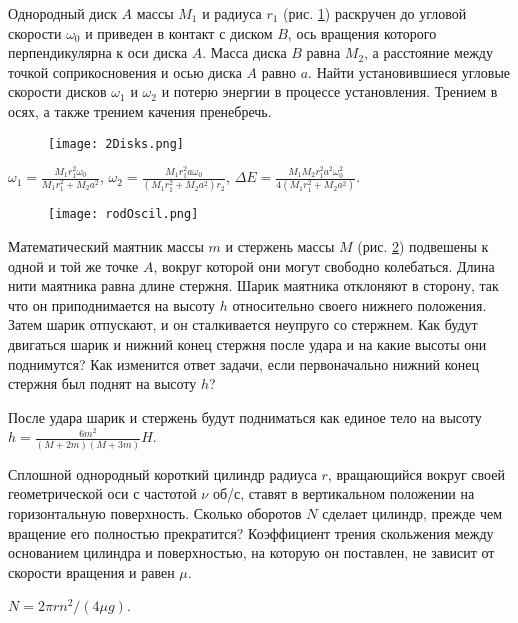\begin{ex} %
Однородный диск $A$ массы $M_1$ и радиуса $r_1$ (рис. \ref{2Disks}) раскручен до угловой скорости $\omega_0$ и приведен в контакт с диском $B$, ось вращения которого перпендикулярна к оси диска $A$. Масса диска $B$ равна $M_2$, а расстояние между точкой соприкосновения и осью диска $A$ равно $a$. Найти установившиеся угловые скорости дисков $\omega_1$ и $\omega_2$ и потерю энергии в процессе установления. Трением в осях, а также трением качения пренебречь.

\begin{figure}[h]
\centering
\texttt{[image: 2Disks.png]}
\caption{}
\label{2Disks}
\end{figure}

\begin{ans}
$\omega_1 = \frac{M_1r_1^2\omega_0}{M_1r_1^2 + M_2a^2}$, $\omega_2 = \frac{M_1r_1^2 a \omega_0}{(M_1r_1^2 + M_2a^2)r_2}$, $\Delta E = \frac{M_1 M_2r_1^2a^2\omega_0^2}{4(M_1r_1^2 + M_2a^2)}$.
\end{ans}
\end{ex}	

\begin{ex} %

\begin{figure}[h]
\centering
\texttt{[image: rodOscil.png]}
\caption{}
\label{rodOscil}
\end{figure}

Математический маятник массы $m$ и стержень массы $M$ (рис. \ref{rodOscil}) подвешены к одной и той же точке $A$, вокруг которой они могут свободно колебаться. Длина нити маятника равна длине стержня. Шарик маятника отклоняют в сторону, так что он приподнимается на высоту $h$ относительно своего нижнего положения. Затем шарик отпускают, и он сталкивается неупруго со стержнем. Как будут двигаться шарик и нижний конец стержня после удара и на какие высоты они поднимутся? Как изменится ответ задачи, если первоначально нижний конец стержня был поднят на высоту $h$?
\begin{ans}
После удара шарик и стержень будут подниматься как единое тело на высоту $h = \frac{6m^2}{(M+2m)(M+3m)}H$.
\end{ans}
\end{ex}	

\begin{ex} %
Сплошной однородный короткий цилиндр радиуса $r$, вращающийся вокруг своей геометрической оси с частотой $\nu$ об/с, ставят в вертикальном положении на горизонтальную поверхность. Сколько оборотов $N$ сделает цилиндр, прежде чем вращение его полностью прекратится? Коэффициент трения скольжения между основанием цилиндра и поверхностью, на которую он поставлен, не зависит от скорости вращения и равен $\mu$.
\begin{ans}
$N = 2\pi r n^2/(4 \mu g)$.
\end{ans}
\end{ex}	

\clearpage